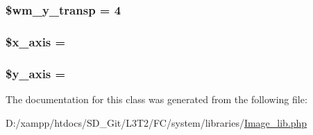\subsubsection[{\$wm\+\_\+y\+\_\+transp}]{\setlength{\rightskip}{0pt plus 5cm}\$wm\+\_\+y\+\_\+transp = 4}\label{class_c_i___image__lib_aa9ab81b196739723a7c38d9431c9fa11}
\hypertarget{class_c_i___image__lib_a128914b11765a500690f876962196ca6}{}
\subsubsection[{\$x\+\_\+axis}]{\setlength{\rightskip}{0pt plus 5cm}\$x\+\_\+axis = \textquotesingle{}\textquotesingle{}}\label{class_c_i___image__lib_a128914b11765a500690f876962196ca6}
\hypertarget{class_c_i___image__lib_ac60512307da37068c0821f7dc2488608}{}
\subsubsection[{\$y\+\_\+axis}]{\setlength{\rightskip}{0pt plus 5cm}\$y\+\_\+axis = \textquotesingle{}\textquotesingle{}}\label{class_c_i___image__lib_ac60512307da37068c0821f7dc2488608}


The documentation for this class was generated from the following file\+:\begin{DoxyCompactItemize}
\item 
D\+:/xampp/htdocs/\+S\+D\+\_\+\+Git/\+L3\+T2/\+F\+C/system/libraries/\hyperlink{_image__lib_8php}{Image\+\_\+lib.\+php}\end{DoxyCompactItemize}
